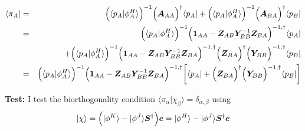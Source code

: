 \documentclass[11pt,a4paper]{report}
\begin{document}
\begin{eqnarray}
\langle\pi_A|&=&
\Bigl(\langle{p}_A|\phi^H_A\rangle\Bigr)^{-1}
\Bigl(\bm{A}_{AA}\Bigr)^\dagger\langle{p}_A|
+
\Bigl(\langle{p}_A|\phi^H_A\rangle\Bigr)^{-1}
\Bigl(\bm{A}_{BA}\Bigr)^\dagger\langle{p}_B|
\nonumber\\
&=&
\Bigl(\langle{p}_A|\phi^H_A\rangle\Bigr)^{-1}
\Bigl(\bm{1}_{AA}-\bm{Z}_{AB}\bm{Y}_{BB}^{-1}\bm{Z}_{BA}
\Bigr)^{-1,\dagger}
\langle{p}_A|
\nonumber\\
&&+
\Bigl(\langle{p}_A|\phi^H_A\rangle\Bigr)^{-1}
\Bigl(\bm{1}_{AA}-\bm{Z}_{AB}\bm{Y}_{BB}^{-1}\bm{Z}_{BA}\Bigr)^{-1,\dagger}
\Bigl(\bm{Z}_{BA}\Bigr)^\dagger
\Bigl(\bm{Y}_{BB}\Bigr)^{-1,\dagger}
\langle{p}_B|
\nonumber\\
&=&
\Bigl(\langle{p}_A|\phi^H_A\rangle\Bigr)^{-1}
\Bigl(\bm{1}_{AA}-\bm{Z}_{AB}\bm{Y}_{BB}^{-1}\bm{Z}_{BA}
\Bigr)^{-1,\dagger}
\biggl[\langle{p}_A|
+
\Bigl(\bm{Z}_{BA}\Bigr)^\dagger
\Bigl(\bm{Y}_{BB}\Bigr)^{-1,\dagger}
\langle{p}_B|\biggr]
\end{eqnarray}



\textbf{Test:} I test the biorthogonality condition
$\langle\pi_\alpha|\chi_\beta\rangle=\delta_{\alpha,\beta}$ using 
\begin{eqnarray}
|\chi\rangle
=\Bigl(|\phi^K\rangle-|\phi^J\rangle \bm{S}^\dagger\Bigr)\bm{c}
=|\phi^H\rangle-|\phi^J\rangle \bm{S}^\dagger\bm{c}
\end{eqnarray}
\end{document}
